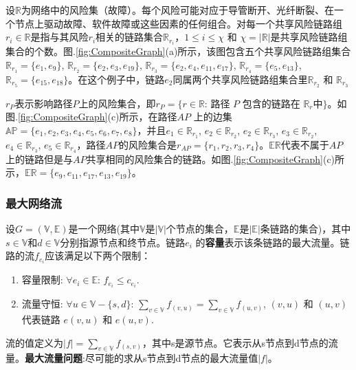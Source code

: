 设$\mathbb{R}$为网络中的风险集（故障）。每个风险可能对应于导管断开、光纤断裂、在一个节点上驱动故障、软件故障或这些因素的任何组合。对每一个共享风险链路组$r_i \in \mathbb{R}$是指与其风险$r_i$相关的链路集合$\mathbb{R}_{r_i}$，$1\leq i\leq \chi$ 和 $\chi=|{\mathbb{R}}|$是共享风险链路组集合的个数。图.\ref{fig:CompositeGraph}(a)所示，该图包含五个共享风险链路组集合$\mathbb{R}_{r_1}=\{e_1,e_9\}$, $\mathbb{R}_{r_2}=\{e_2,e_3,e_{19}\}$, $\mathbb{R}_{r_3}=\{e_2,e_4,e_{11},e_{17}\}$, $\mathbb{R}_{r_4}=\{e_5,e_{13}\}$, $\mathbb{R}_{r_5}=\{e_{15},e_{18}\}$。在这个例子中，链路$e_2$同属两个共享风险链路组集合里$\mathbb{R}_{r_2}$ 和 $\mathbb{R}_{r_3}$


$r_P$表示影响路径$P$上的风险集合，即$r_P=\{r\in \mathbb{R}$: 路径 $P$ 包含的链路在 $\mathbb{R}_r$中$\}$。如图.\ref{fig:CompositeGraph}(c)所示，在路径$AP$ 上的边集$\mathbb{AP}=\{e_1,e_2,e_3,e_4,e_5,e_6,e_7,e_8\}$，并且$e_1\in \mathbb{R}_{r_1}$, $e_2\in \mathbb{R}_{r_2}$, $e_2\in \mathbb{R}_{r_3}$, $e_3\in \mathbb{R}_{r_2}$, $e_4\in \mathbb{R}_{r_3}$, $e_5\in \mathbb{R}_{r_4}$，路径$AP$的风险集合是${r}_{{AP}}=\{r_1, r_2, r_3, r_4\}$。$\mathbb{\mathbb{ER}}$代表不属于$AP$上的链路但是与$AP$共享相同的风险集合的链路。如图.\ref{fig:CompositeGraph}(c)所示，$\mathbb{\mathbb{ER}}=\{e_9,e_{11},e_{17},e_{13},e_{19}\}$。




\subsubsection{最大网络流}
\label{subsubsec:maxFlow}
设$G=(\mathbb{\mathbb{V}},\mathbb{\mathbb{E}})$是一个网络(其中$\mathbb{\mathbb{V}}$是$|\mathbb{\mathbb{V}}|$个节点的集合，$\mathbb{\mathbb{E}}$是$|\mathbb{\mathbb{E}}|$条链路的集合)，其中$s\in \mathbb{V}$和$d\in \mathbb{V}$分别指源节点和终节点。链路$e_i$ 的\textbf{容量}表示该条链路的最大流量。链路的流$f_{e_i}$应该满足以下两个限制：
\begin{enumerate}
  \item 容量限制: $\forall e_i\in \mathbb{\mathbb{E}}$: $f_{e_i}\leq c_{e_i}$.
  \item 流量守恒: $\forall u\in \mathbb{\mathbb{V}}-\{s,d\}$: $\sum\limits_{v\in \mathbb{V}}f_{(v,u)}=\sum\limits_{v\in \mathbb{V}}f_{(u,v)}$,  $(v,u)$ 和 $(u,v)$ 代表链路 $e(v,u)$ 和 $e(u,v)$.
\end{enumerate}

流的值定义为$|f|=\sum\limits_{v\in \mathbb{V}}f_{(s,v)}$，其中s是源节点。它表示从s节点到d节点的流量。\textbf{最大流量问题}:尽可能的求从s节点到d节点的最大流量值$|f|$。


